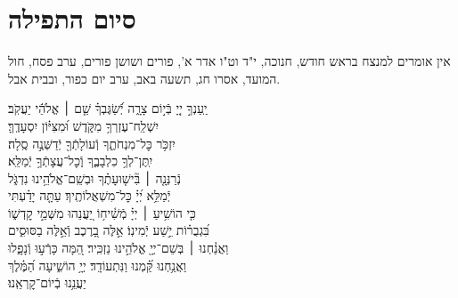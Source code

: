 \documentclass[twoside, openany, parskip=half, 11pt]{book}
\begin{document}
\hagbaha

\nextpage

\galila

\yehalelu

\negline
\kafdalet


\etzchaim






\section[סיום התפילה]{ סיום התפילה }
\label{ashrei}
\ashrei

\begin{scriptsize} %
\textsf{
אין אומרים למנצח בראש חודש, חנוכה, י"ד וט"ו אדר א', פורים ושושן פורים,
ערב פסח, חול המועד, אסרו חג, תשעה באב, ערב יום כפור, ובבית אבל.}

\end{scriptsize}

\begin{narrow}
\hfill \break
יַֽעַנְךָ֣ יְיָ֭ בְּֿי֣וֹם צָרָ֑ה \hfill יְֿ֝שַׂגֶּבְךָ֗ שֵׁ֤ם ׀ אֱלֹהֵ֬י יַעֲקֹֽב׃ \\
יִשְׁלַֽח־עֶזְרְךָ֥ מִקֹּ֑דֶשׁ \hfill וּ֝מִצִּיּ֗וֹן יִסְעָדֶֽךָּ׃ \\
יִזְכֹּ֥ר כׇּל־מִנְחֹתֶ֑ךָ \hfill וְֿעוֹלָתְֿךָ֖ יְֿדַשְּׁנֶ֣ה סֶֽלָה׃ \\
יִֽתֶּן־לְךָ֥ כִלְבָבֶ֑ךָ \hfill וְֽֿכׇל־עֲצָתְֿךָ֥ יְֿמַלֵּֽא׃ \\
נְֿרַנְּנָ֤ה ׀ בִּ֘ישׁ֤וּעָתֶ֗ךָ \hfill וּבְשֵֽׁם־אֱלֹהֵ֥ינוּ נִדְגֹּ֑ל \\ יְֿמַלֵּ֥א יְ֝יָ֗ כׇּל־מִשְׁאֲלוֹתֶֽיךָ׃ \hfill
עַתָּ֤ה יָדַ֗עְתִּי\\ כִּ֤י הוֹשִׁ֥יעַ ׀ יְיָ֗ מְֿשִׁ֫יח֥וֹ \hfill יַ֭עֲנֵהוּ מִשְּׁמֵ֣י קׇדְשׁ֑וֹ\\ בִּ֝גְבֻר֗וֹת יֵ֣שַׁע יְֿמִינֽוֹ׃ \hfill
אֵ֣לֶּה בָ֭רֶכֶב וְֿאֵ֣לֶּה בַסּוּסִ֑ים\\ וַאֲנַ֓חְנוּ ׀ בְּשֵׁם־יְיָ֖ אֱלֹהֵ֣ינוּ נַזְכִּֽיר׃ \hfill
הֵ֭מָּה כָּרְֿע֣וּ וְֿנָפָ֑לוּ \\ וַאֲנַ֥חְנוּ קַּ֝֗מְנוּ וַנִּתְעוֹדָֽד׃ \hfill
יְיָ֥ הוֹשִׁ֑יעָה הַ֝מֶּ֗לֶךְ\\ יַעֲנֵ֥נוּ בְֿיוֹם־קׇרְאֵֽנוּ׃ \hfill \break

\end{narrow}
\end{document}
